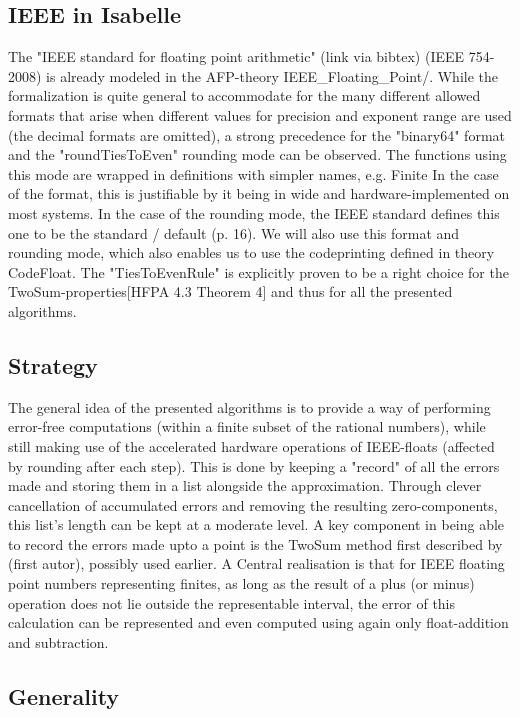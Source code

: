 \documentclass[11pt,a4paper]{article}
\begin{document}
\subsection{IEEE in Isabelle}

The "IEEE standard for floating point arithmetic" (link via bibtex) (IEEE 754-2008) is already modeled in the AFP-theory IEEE\_Floating\_Point/\IEEE.
While the formalization is quite general to accommodate for the many different allowed formats that arise when different values for precision and exponent range are used (the decimal formats are omitted), a strong precedence for the "binary64" format and the "roundTiesToEven" rounding mode can be observed. The functions using this mode are wrapped in definitions with simpler names, e.g. Finite
In the case of the format, this is justifiable by it being in wide and hardware-implemented on most systems.
In the case of the rounding mode, the IEEE standard defines this one to be the standard / default (p. 16).
We will also use this format and rounding mode, which also enables us to use the codeprinting defined in theory CodeFloat. The "TiesToEvenRule" is explicitly proven to be a right choice for the TwoSum-properties[HFPA 4.3 Theorem 4] and thus for all the presented algorithms.

\subsection{Strategy}

The general idea of the presented algorithms is to provide a way of performing error-free computations (within a finite subset of the rational numbers), while still making use of the accelerated hardware operations of IEEE-floats (affected by rounding after each step). This is done by keeping a "record" of all the errors made and storing them in a list alongside the approximation. Through clever cancellation of accumulated errors and removing the resulting zero-components, this list's length can be kept at a moderate level.
A key component in being able to record the errors made upto a point is the TwoSum method first described by (first autor), possibly used earlier. A Central realisation is that for IEEE floating point numbers representing finites, as long as the result of a plus (or minus) operation does not lie outside the representable interval, the error of this calculation can be represented and even computed using again only float-addition and subtraction.

\subsection{Generality}
\end{document}
